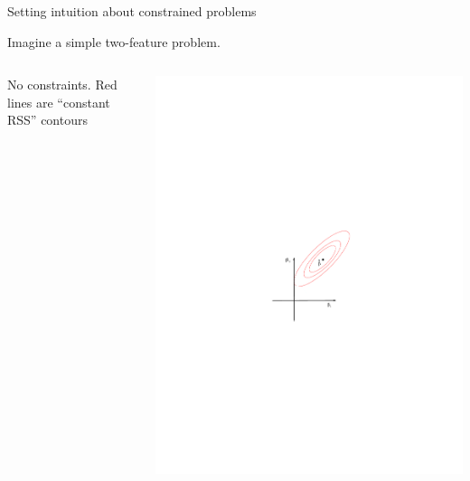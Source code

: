 \documentclass[mathserif, handout, aspectratio=169]{beamer}
\begin{document}
\begin{frame}{Setting intuition about constrained problems}

Imagine a simple two-feature problem.  

\begin{columns}

\begin{center}
No constraints.  Red lines are ``constant RSS'' contours
\end{center}
\includegraphics[scale=0.65]{RSE_contour}


\end{columns}
\end{frame}
\end{document}
